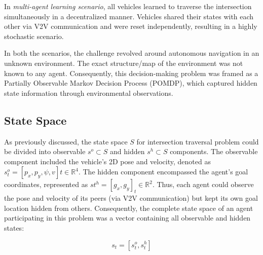 \documentclass[letterpaper, 10 pt, conference]{ieeeconf}  %
\begin{document}
In \textit{multi-agent learning scenario}, all vehicles learned to traverse the intersection simultaneously in a decentralized manner. Vehicles shared their states with each other via V2V communication and were reset independently, resulting in a highly stochastic scenario.

In both the scenarios, the challenge revolved around autonomous navigation in an unknown environment. The exact structure/map of the environment was not known to any agent. Consequently, this decision-making problem was framed as a Partially Observable Markov Decision Process (POMDP), which captured hidden state information through environmental observations.

\subsection{State Space}
\label{Sub-Section: State Space I}

As previously discussed, the state space $S$ for intersection traversal problem could be divided into observable $s^o \subset S$ and hidden $s^h \subset S$ components. The observable component included the vehicle's 2D pose and velocity, denoted as $s_{t}^{o}=\left [ p_{x}, p_{y}, \psi, v \right ]{t} \in \mathbb{R}^{4}$. The hidden component encompassed the agent's goal coordinates, represented as $s{t}^{h}=\left [ g_{x}, g_{y} \right ]_{t} \in \mathbb{R}^{2}$. Thus, each agent could observe the pose and velocity of its peers (via V2V communication) but kept its own goal location hidden from others. Consequently, the complete state space of an agent participating in this problem was a vector containing all observable and hidden states:

\begin{equation}
\label{eqn1}
s_{t} = \left [ s_{t}^{o}, s_{t}^{h} \right ]
\end{equation}
\end{document}
